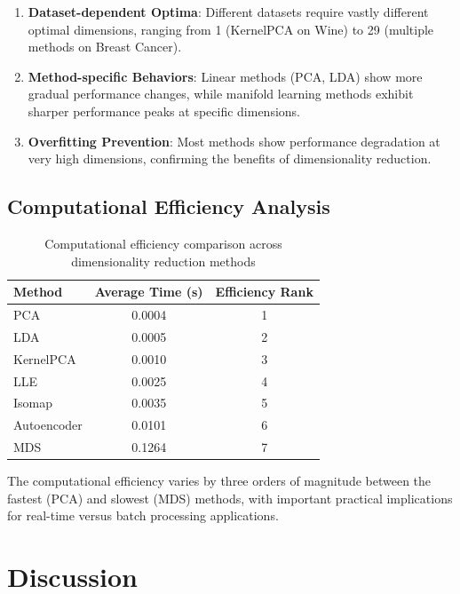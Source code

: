 \documentclass[review]{elsarticle}
\begin{document}
\begin{enumerate}
\item \textbf{Dataset-dependent Optima}: Different datasets require vastly different optimal dimensions, ranging from 1 (KernelPCA on Wine) to 29 (multiple methods on Breast Cancer).

\item \textbf{Method-specific Behaviors}: Linear methods (PCA, LDA) show more gradual performance changes, while manifold learning methods exhibit sharper performance peaks at specific dimensions.

\item \textbf{Overfitting Prevention}: Most methods show performance degradation at very high dimensions, confirming the benefits of dimensionality reduction.
\end{enumerate}

\subsection{Computational Efficiency Analysis}

\begin{table}[h]
\centering
\caption{Computational efficiency comparison across dimensionality reduction methods}
\label{tab:efficiency}
\begin{tabular}{@{}lcc@{}}
\toprule
\textbf{Method} & \textbf{Average Time (s)} & \textbf{Efficiency Rank} \\
\midrule
PCA & 0.0004 & 1 \\
LDA & 0.0005 & 2 \\
KernelPCA & 0.0010 & 3 \\
LLE & 0.0025 & 4 \\
Isomap & 0.0035 & 5 \\
Autoencoder & 0.0101 & 6 \\
MDS & 0.1264 & 7 \\
\bottomrule
\end{tabular}
\end{table}

The computational efficiency varies by three orders of magnitude between the fastest (PCA) and slowest (MDS) methods, with important practical implications for real-time versus batch processing applications.

\section{Discussion}
\label{sec:discussion}
\end{document}
